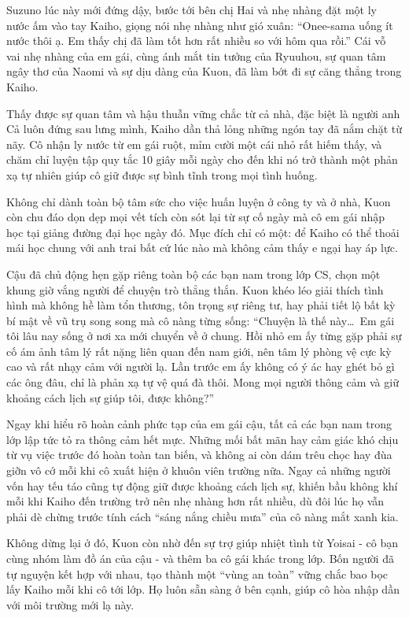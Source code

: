 \documentclass[../main.tex]{subfiles}
\begin{document}
Suzuno lúc này mới đứng dậy, bước tới bên chị Hai và nhẹ nhàng đặt một ly nước ấm vào tay Kaiho, giọng nói nhẹ nhàng như gió xuân: ``Onee-sama uống ít nước thôi ạ. Em thấy chị đã làm tốt hơn rất nhiều so với hôm qua rồi.'' Cái vỗ vai nhẹ nhàng của em gái, cùng ánh mắt tin tưởng của Ryuuhou, sự quan tâm ngây thơ của Naomi và sự dịu dàng của Kuon, đã làm bớt đi sự căng thẳng trong Kaiho.

Thấy được sự quan tâm và hậu thuẫn vững chắc từ cả nhà, đặc biệt là người anh Cả luôn đứng sau lưng mình, Kaiho dần thả lỏng những ngón tay đã nắm chặt từ nãy. Cô nhận ly nước từ em gái ruột, mỉm cười một cái nhỏ rất hiếm thấy, và chăm chỉ luyện tập quy tắc 10 giây mỗi ngày cho đến khi nó trở thành một phản xạ tự nhiên giúp cô giữ được sự bình tĩnh trong mọi tình huống.

\ct

Không chỉ dành toàn bộ tâm sức cho việc huấn luyện ở công ty và ở nhà, Kuon còn chu đáo dọn dẹp mọi vết tích còn sót lại từ sự cố ngày mà cô em gái nhập học tại giảng đường đại học ngày đó. Mục đích chỉ có một: để Kaiho có thể thoải mái học chung với anh trai bất cứ lúc nào mà không cảm thấy e ngại hay áp lực.

Cậu đã chủ động hẹn gặp riêng toàn bộ các bạn nam trong lớp CS, chọn một khung giờ vắng người để chuyện trò thẳng thắn. Kuon khéo léo giải thích tình hình mà không hề làm tổn thương, tôn trọng sự riêng tư, hay phải tiết lộ bất kỳ bí mật về vũ trụ song song mà cô nàng từng sống: ``Chuyện là thế này\dots\ Em gái tôi lâu nay sống ở nơi xa mới chuyển về ở chung. Hồi nhỏ em ấy từng gặp phải sự cố ám ảnh tâm lý rất nặng liên quan đến nam giới, nên tâm lý phòng vệ cực kỳ cao và rất nhạy cảm với người lạ. Lần trước em ấy không có ý ác hay ghét bỏ gì các ông đâu, chỉ là phản xạ tự vệ quá đà thôi. Mong mọi người thông cảm và giữ khoảng cách lịch sự giúp tôi, được không?''

Ngay khi hiểu rõ hoàn cảnh phức tạp của em gái cậu, tất cả các bạn nam trong lớp lập tức tỏ ra thông cảm hết mực. Những mối bất mãn hay cảm giác khó chịu từ vụ việc trước đó hoàn toàn tan biến, và không ai còn dám trêu chọc hay đùa giỡn vô cớ mỗi khi cô xuất hiện ở khuôn viên trường nữa. Ngay cả những người vốn hay tếu táo cũng tự động giữ được khoảng cách lịch sự, khiến bầu không khí mỗi khi Kaiho đến trường trở nên nhẹ nhàng hơn rất nhiều, dù đôi lúc họ vẫn phải dè chừng trước tính cách ``sáng nắng chiều mưa'' của cô nàng mắt xanh kia.

Không dừng lại ở đó, Kuon còn nhờ đến sự trợ giúp nhiệt tình từ Yoisai - cô bạn cùng nhóm làm đồ án của cậu - và thêm ba cô gái khác trong lớp. Bốn người đã tự nguyện kết hợp với nhau, tạo thành một ``vùng an toàn'' vững chắc bao bọc lấy Kaiho mỗi khi cô tới lớp. Họ luôn sẵn sàng ở bên cạnh, giúp cô hòa nhập dần với môi trường mới lạ này.
\end{document}
